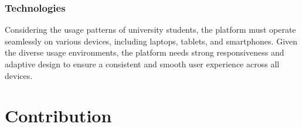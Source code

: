 \documentclass[12pt]{article}
\begin{document}
        \subsubsection*{Technologies}
            Considering the usage patterns of university students, the platform must operate seamlessly on various devices, including laptops, tablets, and smartphones. Given the diverse usage environments, the platform needs strong responsiveness and adaptive design to ensure a consistent and smooth user experience across all devices.

\section{Contribution}



       

 
\end{document}

